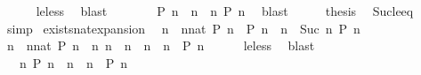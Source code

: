 \begin{isabellebody}
\ \ \ \ \isamarkupfalse%
\ le{\isacharunderscore}less\ \isamarkupfalse%
\ blast\isanewline
\ \ \isamarkupfalse%
\ \isamarkupfalse%
\ {\isacartoucheopen}{\isachardot}{\isachardot}{\isachardot}\ {\isacharequal}\ {\isacharparenleft}P\ n\ {\isasymand}\ {\isacharparenleft}{\isasymforall}n\ {\isachargreater}\ n\ P\ n{\isacharparenright}{\isacharparenright}{\isacartoucheclose}\ \isamarkupfalse%
\ blast\isanewline
\ \ \isamarkupfalse%
\ \isamarkupfalse%
\ {\isacharquery}thesis\ \isamarkupfalse%
\ Suc{\isacharunderscore}le{\isacharunderscore}eq\ \isamarkupfalse%
\ simp\isanewline
{}\isamarkupfalse%
%
\endisatagproof
{\isafoldproof}%
%
\isadelimproof
\isanewline
%
\endisadelimproof
\isanewline
{}\isamarkupfalse%
\ exists{\isacharunderscore}nat{\isacharunderscore}expansion{\isacharcolon}\isanewline
\ \ {\isacartoucheopen}{\isacharparenleft}{\isasymexists}n\ {\isasymge}\ {\isacharparenleft}nnat{\isacharparenright}{\isachardot}\ P\ n{\isacharparenright}\ {\isacharequal}\ {\isacharparenleft}P\ n\ {\isasymor}\ {\isacharparenleft}{\isasymexists}n\ {\isasymge}\ Suc\ n\ P\ n{\isacharparenright}{\isacharparenright}{\isacartoucheclose}\isanewline
%
\isadelimproof
%
\endisadelimproof
%
\isatagproof
{}\isamarkupfalse%
\ {\isacharminus}\isanewline
\ \ \isamarkupfalse%
\ {\isacartoucheopen}{\isacharparenleft}{\isasymexists}n\ {\isasymge}\ {\isacharparenleft}nnat{\isacharparenright}{\isachardot}\ P\ n{\isacharparenright}\ {\isacharequal}\ {\isacharparenleft}{\isasymexists}n{\isachardot}\ {\isacharparenleft}n\ {\isacharequal}\ n\ {\isasymor}\ n\ {\isachargreater}\ n\ {\isasymand}\ P\ n{\isacharparenright}{\isacartoucheclose}\isanewline
\ \ \ \ \isamarkupfalse%
\ le{\isacharunderscore}less\ \isamarkupfalse%
\ blast\isanewline
\ \ \isamarkupfalse%
\ \isamarkupfalse%
\ {\isacartoucheopen}{\isachardot}{\isachardot}{\isachardot}\ {\isacharequal}\ {\isacharparenleft}{\isasymexists}n{\isachardot}\ {\isacharparenleft}P\ n\ {\isasymor}\ {\isacharparenleft}n\ {\isachargreater}\ n\ {\isasymand}\ P\ n{\isacharparenright}{\isacharparenright}{\isacartoucheclose}\ \isamarkupfalse%

\end{isabellebody}
